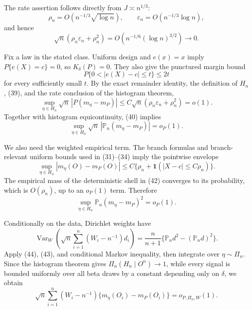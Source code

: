 The rate assertion follows directly from \(J\asymp n^{1/3}\):
\begin{equation}
 \rho_n=O(n^{-1/3}\sqrt{\log n}),\qquad
 \varepsilon_n=O(n^{-1/3}\log n),
\end{equation}
and hence
\begin{equation}
 \sqrt n(\rho_n\varepsilon_n+\rho_n^2)
 =O(n^{-1/6}(\log n)^{3/2})\longrightarrow0.                                             \tag{38}
\end{equation}

Fix a law in the stated class.  Uniform design and \(e(x)=x\) imply
\(P\{e(X)=c\}=0\), so \(K_\delta(P)=0\).  They also give the punctured margin bound
\begin{equation}
 P\{0<|e(X)-c|\le t\}\le2t                                                            \tag{39}
\end{equation}
for every sufficiently small \(t\).  By the exact remainder identity, the definition of \(H_n\), (39), and the rate conclusion of the histogram theorem,
\begin{equation}
 \sup_{\eta\in H_n}\sqrt n\,|P(m_\eta-m_P)|
 \le C\sqrt n(\rho_n\varepsilon_n+\rho_n^2)=o(1).                                     \tag{40}
\end{equation}
Together with histogram equicontinuity, (40) implies
\begin{equation}
 \sup_{\eta\in H_n}\sqrt n\,|\mathbb P_n(m_\eta-m_P)|=o_P(1).                       \tag{41}
\end{equation}

We also need the weighted empirical term.  The branch formulas and branch-relevant uniform bounds used in (31)--(34) imply the pointwise envelope
\begin{equation}
 \sup_{\eta\in H_n}|m_\eta(O)-m_P(O)|
 \le C\{\rho_n+\mathbf1(|X-c|\le C\rho_n)\}.                                          \tag{42}
\end{equation}
The empirical mass of the deterministic shell in (42) converges to its probability, which is \(O(\rho_n)\), up to an \(o_P(1)\) term.  Therefore
\begin{equation}
 \sup_{\eta\in H_n}\mathbb P_n(m_\eta-m_P)^2=o_P(1).                                 \tag{43}
\end{equation}

Conditionally on the data, Dirichlet weights have
\begin{equation}
 \operatorname{Var}_W\!\left(\sqrt n\sum_{i=1}^n(W_i-n^{-1})d_i\right)
 =\frac n{n+1}\{\mathbb P_nd^2-(\mathbb P_nd)^2\}.                                    \tag{44}
\end{equation}
Apply (44), (43), and conditional Markov inequality, then integrate over
\(\eta\sim\Pi_n\).  Since the histogram theorem gives \(\Pi_n(H_n\mid O^n)\to1\), while every signal is bounded uniformly over all beta draws by a constant depending only on \(\delta\), we obtain
\begin{equation}
 \sqrt n\sum_{i=1}^n(W_i-n^{-1})\{m_\eta(O_i)-m_P(O_i)\}=o_{P,\Pi_n,W}(1).             \tag{45}
\end{equation}


